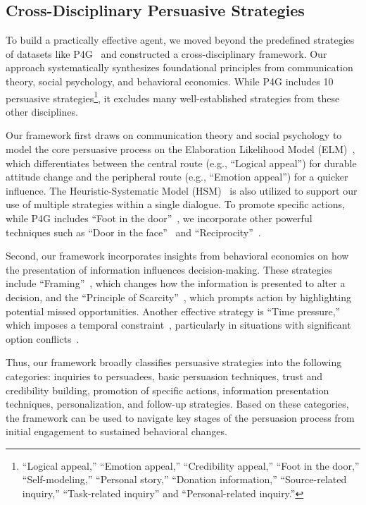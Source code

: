\documentclass[11pt]{article}
\begin{document}
\subsection{Cross-Disciplinary Persuasive Strategies}
To build a practically effective agent, we moved beyond the predefined strategies of datasets like P4G~\citep{wang-etal-2019-persuasion} and constructed a cross-disciplinary framework. Our approach systematically synthesizes foundational principles from communication theory, social psychology, and behavioral economics. 
While P4G includes 10 persuasive strategies\footnote{``Logical appeal,'' ``Emotion appeal,'' ``Credibility appeal,'' ``Foot in the door,'' ``Self-modeling,'' ``Personal story,'' ``Donation information,'' ``Source-related inquiry,'' ``Task-related inquiry'' and ``Personal-related inquiry.''}, it excludes many well-established strategies from these other disciplines.

Our framework first draws on communication theory and social psychology to model the core persuasive process on the Elaboration Likelihood Model (ELM)~\citep{petty1986communication}, which differentiates between the central route (e.g., ``Logical appeal'') for durable attitude change and the peripheral route (e.g., ``Emotion appeal'') for a quicker influence. 
The Heuristic-Systematic Model (HSM)~\citep{chaiken1980heuristic} is also utilized to support our use of multiple strategies within a single dialogue. 
To promote specific actions, while P4G includes ``Foot in the door''~\citep{freedman1966compliance}, we incorporate other powerful techniques such as ``Door in the face''~\citep{cialdini1975reciprocal} and ``Reciprocity''~\citep{cialdini2001science}.

Second, our framework incorporates insights from behavioral economics on how the presentation of information influences decision-making. 
These strategies include ``Framing''~\citep{tversky1981framing}, which changes how the information is presented to alter a decision, and the ``Principle of Scarcity''~\citep{Cialdini1984, cialdini2001science}, which prompts action by highlighting potential missed opportunities. 
Another effective strategy is ``Time pressure,'' which imposes a temporal constraint~\citep{kruglanski1983freezing}, particularly in situations with significant option conflicts~\citep{dhar1999effect}.

Thus, our framework broadly classifies persuasive strategies into the following categories: inquiries to persuadees, basic persuasion techniques, trust and credibility building, promotion of specific actions, information presentation techniques, personalization, and follow-up strategies. 
Based on these categories, the framework can be used to navigate key stages of the persuasion process from initial engagement to sustained behavioral changes.
\end{document}
